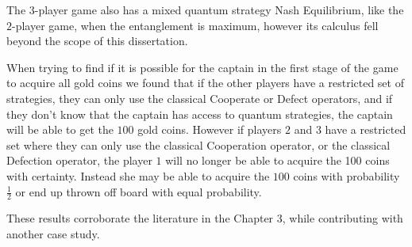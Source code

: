 The $3$-player game also has a mixed quantum strategy Nash Equilibrium, like the $2$-player game, when the entanglement is maximum, however its calculus fell beyond the scope of this dissertation. 

When trying to find if it is possible for the captain in the first stage of the game to acquire all gold coins we found that if the other players have a restricted set of strategies, they can only use the classical Cooperate or Defect operators, and if they don't know that the captain has access to quantum strategies, the captain will be able to get the $100$ gold coins. However if players $2$ and $3$ have a restricted set where they can only use the classical Cooperation operator, or the classical Defection operator, the player $1$ will no longer be able to acquire the 100 coins with certainty. Instead she may be able to acquire the $100$ coins with probability $\frac{1}{2}$ or end up thrown off board with equal probability.

These results corroborate the literature in the Chapter 3, while contributing with another case study.


 






